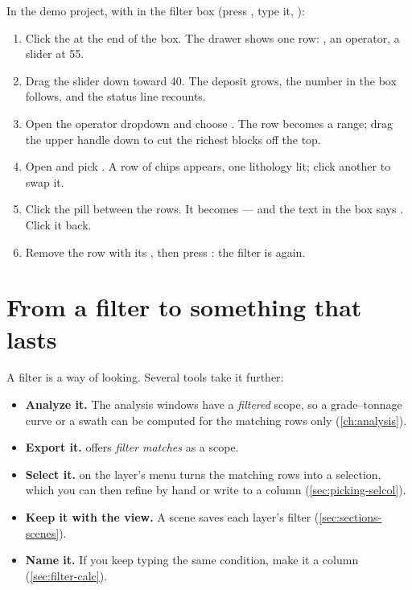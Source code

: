 \begin{tryit}
In the demo project, with  in the filter box (press \key{/}, type it, ):
\begin{enumerate}
\item Click the  at the end of the box. The drawer shows one row: , an operator, a slider at 55.
\item Drag the slider down toward 40. The deposit grows, the number in the box follows, and the status line recounts.
\item Open the operator dropdown and choose . The row becomes a range; drag the upper handle down to cut the richest blocks off the top.
\item Open  and pick . A row of chips appears, one lithology lit; click another to swap it.
\item Click the  pill between the rows. It becomes  — and the text in the box says . Click it back.
\item Remove the  row with its , then press : the filter is  again.
\end{enumerate}
\end{tryit}

\section{From a filter to something that lasts}\label{sec:filter-next}
A filter is a way of looking. Several tools take it further:

\begin{itemize}
\item \textbf{Analyze it.} The analysis windows have a \emph{filtered} scope, so a grade–tonnage curve or a swath can be computed for the matching rows only (\cref{ch:analysis}).
\item \textbf{Export it.}  offers \emph{filter matches} as a scope.
\item \textbf{Select it.}  on the layer's menu turns the matching rows into a selection, which you can then refine by hand or write to a column (\cref{sec:picking-selcol}).
\item \textbf{Keep it with the view.} A scene saves each layer's filter (\cref{sec:sections-scenes}).
\item \textbf{Name it.} If you keep typing the same condition, make it a column (\cref{sec:filter-calc}).
\end{itemize}

